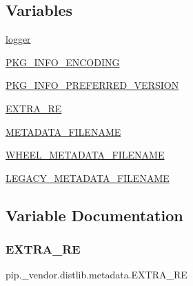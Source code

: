 \subsection*{Variables}
\begin{DoxyCompactItemize}
\item 
\hyperlink{namespacepip_1_1__vendor_1_1distlib_1_1metadata_a95a25758dfdcebd0e28cbc69ee8b3385}{logger}
\item 
\hyperlink{namespacepip_1_1__vendor_1_1distlib_1_1metadata_aa5125f773da7b9d201f20e699f7a9cba}{P\+K\+G\+\_\+\+I\+N\+F\+O\+\_\+\+E\+N\+C\+O\+D\+I\+NG}
\item 
\hyperlink{namespacepip_1_1__vendor_1_1distlib_1_1metadata_a11873fc867945c22fcc736646437410e}{P\+K\+G\+\_\+\+I\+N\+F\+O\+\_\+\+P\+R\+E\+F\+E\+R\+R\+E\+D\+\_\+\+V\+E\+R\+S\+I\+ON}
\item 
\hyperlink{namespacepip_1_1__vendor_1_1distlib_1_1metadata_a4832d31a175dc6b4dbf839ad0b82e0ad}{E\+X\+T\+R\+A\+\_\+\+RE}
\item 
\hyperlink{namespacepip_1_1__vendor_1_1distlib_1_1metadata_af841be45ef92c53e0ac525b64d1eb363}{M\+E\+T\+A\+D\+A\+T\+A\+\_\+\+F\+I\+L\+E\+N\+A\+ME}
\item 
\hyperlink{namespacepip_1_1__vendor_1_1distlib_1_1metadata_a72aa2c5c9f034c1d64ba9af503502a08}{W\+H\+E\+E\+L\+\_\+\+M\+E\+T\+A\+D\+A\+T\+A\+\_\+\+F\+I\+L\+E\+N\+A\+ME}
\item 
\hyperlink{namespacepip_1_1__vendor_1_1distlib_1_1metadata_ad89982ec8513fefff4f024aed7748e4f}{L\+E\+G\+A\+C\+Y\+\_\+\+M\+E\+T\+A\+D\+A\+T\+A\+\_\+\+F\+I\+L\+E\+N\+A\+ME}
\end{DoxyCompactItemize}


\subsection{Variable Documentation}
\mbox{\label{namespacepip_1_1__vendor_1_1distlib_1_1metadata_a4832d31a175dc6b4dbf839ad0b82e0ad}} 
\subsubsection{\texorpdfstring{E\+X\+T\+R\+A\+\_\+\+RE}{EXTRA\_RE}}
{\footnotesize\ttfamily pip.\+\_\+vendor.\+distlib.\+metadata.\+E\+X\+T\+R\+A\+\_\+\+RE}

